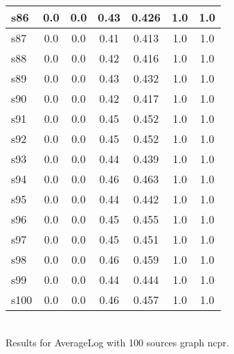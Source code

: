 \documentclass{article}
\begin{document}
\begin{tabular}{|l|c|c|c|c|c|c|}
\hline
s86 &0.0 & 0.0 & 0.43 & 0.426 & 1.0 & 1.0\\
\hline
s87 &0.0 & 0.0 & 0.41 & 0.413 & 1.0 & 1.0\\
\hline
s88 &0.0 & 0.0 & 0.42 & 0.416 & 1.0 & 1.0\\
\hline
s89 &0.0 & 0.0 & 0.43 & 0.432 & 1.0 & 1.0\\
\hline
s90 &0.0 & 0.0 & 0.42 & 0.417 & 1.0 & 1.0\\
\hline
s91 &0.0 & 0.0 & 0.45 & 0.452 & 1.0 & 1.0\\
\hline
s92 &0.0 & 0.0 & 0.45 & 0.452 & 1.0 & 1.0\\
\hline
s93 &0.0 & 0.0 & 0.44 & 0.439 & 1.0 & 1.0\\
\hline
s94 &0.0 & 0.0 & 0.46 & 0.463 & 1.0 & 1.0\\
\hline
s95 &0.0 & 0.0 & 0.44 & 0.442 & 1.0 & 1.0\\
\hline
s96 &0.0 & 0.0 & 0.45 & 0.455 & 1.0 & 1.0\\
\hline
s97 &0.0 & 0.0 & 0.45 & 0.451 & 1.0 & 1.0\\
\hline
s98 &0.0 & 0.0 & 0.46 & 0.459 & 1.0 & 1.0\\
\hline
s99 &0.0 & 0.0 & 0.44 & 0.444 & 1.0 & 1.0\\
\hline
s100 &0.0 & 0.0 & 0.46 & 0.457 & 1.0 & 1.0\\
\hline
\end{tabular}\\

\noindent Results for AverageLog with 100 sources graph ncpr.
\end{document}
